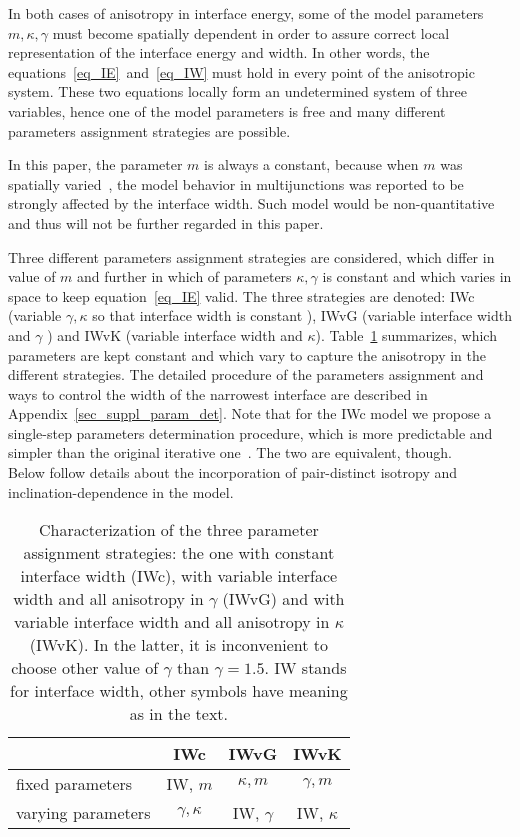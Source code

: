 	In both cases of anisotropy in interface energy, some of the model parameters $m,\kappa, \gamma$ must become spatially dependent in order to assure correct local representation of the interface energy and width. In other words, the equations~\eqref{eq_IE}~and~\eqref{eq_IW} must hold in every point of the anisotropic system.
	These two equations locally form an undetermined system of three variables, hence one of the model parameters is free and many different parameters assignment strategies are possible.
	
	In this paper, the parameter $m$ is always a constant, because when $m$ was spatially varied~\cite{Moelans2008}, the model behavior in multijunctions was reported to be strongly affected by the interface width. Such model would be non-quantitative and thus will not be further regarded in this paper.
	
	Three different parameters assignment strategies are considered, which differ in value of $m$ and further in which of parameters $\kappa,\gamma$ is constant and which varies in space to keep equation~\eqref{eq_IE} valid. The three strategies are denoted: IWc (variable $\gamma,\kappa$ so that interface width is constant  \cite{Moelans2008}), IWvG (variable interface width and $\gamma$ \cite{Ravash2017}) and IWvK (variable interface width and $\kappa$).   Table~\ref{tab_models_comparison} summarizes, which parameters are kept constant and which vary to capture the anisotropy in the different strategies. The detailed procedure of the parameters assignment and ways to control the width of the narrowest interface are described in Appendix~\ref{sec_suppl_param_det}. Note that for the IWc model we propose a single-step parameters determination procedure, which is more predictable and simpler than the original iterative one~\cite{Moelans2008}. The two are equivalent, though.\\
	Below follow details about the incorporation of pair-distinct isotropy and inclination-dependence in the model. 
	
	\begin{table}[h]
		\centering
		\caption[PF model - characterization of the three parameter assignment strategies]{Characterization of the three parameter assignment strategies: the one with constant interface width (IWc), with variable interface width and all anisotropy in $\gamma$ (IWvG) and with variable interface width and all anisotropy in $\kappa$ (IWvK). In the latter, it is inconvenient to choose other value of $\gamma$ than $\gamma=1.5$. IW stands for interface width, other symbols have meaning as in the text.}
		\label{tab_models_comparison}
		\begin{tabular}{l|c|c|c|}\footnotesize
			& IWc & IWvG & IWvK \\ \hline
			fixed parameters & IW, $m$ & $\kappa, m$ & $\gamma, m$  \\
			varying parameters & $\gamma, \kappa$ & IW, $\gamma$ & IW, $\kappa$
		\end{tabular}
	\end{table}


